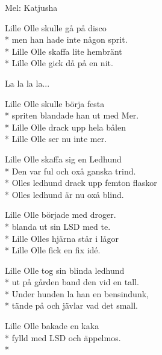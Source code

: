 \begin{SongText}
    \begin{SongInfo}
        Mel: Katjusha
    \end{SongInfo}
    \begin{SongVerse}
        Lille Olle skulle gå på disco\\*%
        men han hade inte någon sprit.\\*%
        Lille Olle skaffa lite hembränt\\*%
        Lille Olle gick då på en nit.
    \end{SongVerse}
    \begin{SongVerse}
        La la la la...
    \end{SongVerse}
    \begin{SongVerse}
        Lille Olle skulle börja festa\\*%
        spriten blandade han ut med Mer.\\*%
        Lille Olle drack upp hela bålen\\*%
        Lille Olle ser nu inte mer.
    \end{SongVerse}
    \begin{SongVerse}
        Lille Olle skaffa sig en Ledhund\\*%
        Den var ful och oxå ganska trind.\\*%
        Olles ledhund drack upp femton flaskor\\*%
        Olles ledhund är nu oxå blind.
    \end{SongVerse}
    \begin{SongVerse}
        Lille Olle började med droger.\\*%
        blanda ut sin LSD med te.\\*%
        Lille Olles hjärna står i lågor\\*%
        Lille Olle fick en fix idé.
    \end{SongVerse}
    \begin{SongVerse}
        Lille Olle tog sin blinda ledhund\\*%
        ut på gården band den vid en tall.\\*%
        Under hunden la han en bensindunk,\\*%
        tände på och jävlar vad det small.
    \end{SongVerse}
    \begin{SongVerse}
        Lille Olle bakade en kaka\\*%
        fylld med LSD och äppelmos.\\*%

\end{SongVerse}
\end{SongText}
